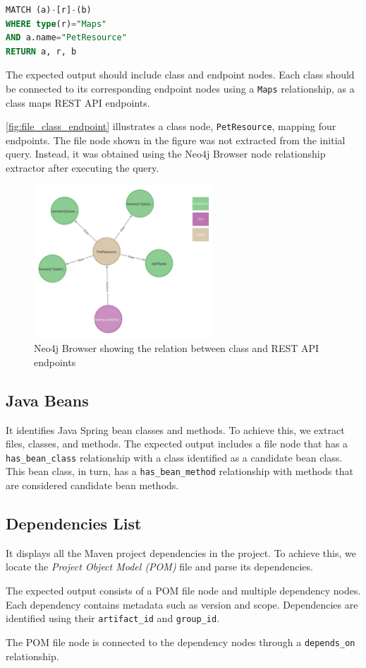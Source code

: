 \begin{lstlisting}[language=SQL]
MATCH (a)-[r]-(b)
WHERE type(r)="Maps"
AND a.name="PetResource"
RETURN a, r, b
\end{lstlisting}

The expected output should include class and endpoint nodes. Each class should be connected to its corresponding endpoint nodes using a \texttt{Maps} relationship, as a class maps REST API endpoints.

\autoref{fig:file_class_endpoint} illustrates a class node, \texttt{PetResource}, mapping four endpoints. The file node shown in the figure was not extracted from the initial query. Instead, it was obtained using the Neo4j Browser node relationship extractor after executing the query.

\begin{figure}[H]
    \centering
    \includegraphics[width=0.6\textwidth]{figures/file_class_endpoint.png}
    \caption{Neo4j Browser showing the relation between class and REST API endpoints}
    \label{fig:file_class_endpoint}
\end{figure}

\subsection{Java Beans}
It identifies Java Spring bean classes and methods. To achieve this, we extract files, classes, and methods. The expected output includes a file node that has a \texttt{has\_bean\_class} relationship with a class identified as a candidate bean class. This bean class, in turn, has a \texttt{has\_bean\_method} relationship with methods that are considered candidate bean methods.

\subsection{Dependencies List}
It displays all the Maven project dependencies in the project. To achieve this, we locate the \textit{Project Object Model (POM)} file and parse its dependencies.

The expected output consists of a POM file node and multiple dependency nodes. Each dependency contains metadata such as version and scope. Dependencies are identified using their \texttt{artifact\_id} and \texttt{group\_id}.

The POM file node is connected to the dependency nodes through a \texttt{depends\_on} relationship.